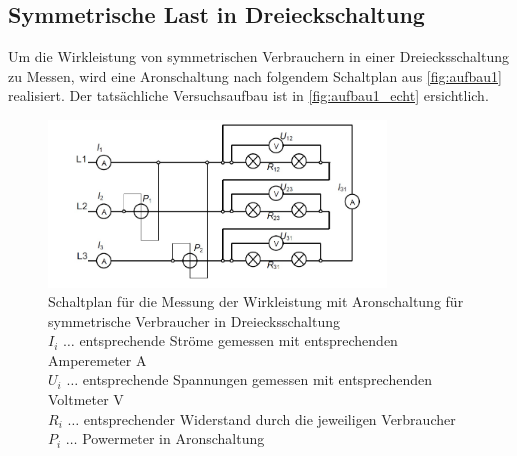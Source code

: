 \documentclass[12pt,english,ngerman]{scrartcl}
\begin{document}
\subsection{Symmetrische Last in Dreieckschaltung}

Um die Wirkleistung von symmetrischen Verbrauchern in einer Dreiecksschaltung zu Messen, wird eine Aronschaltung
 nach folgendem Schaltplan aus \autoref{fig:aufbau1} realisiert. 
 Der tatsächliche Versuchsaufbau ist in \autoref{fig:aufbau1_echt} ersichtlich.

 \begin{figure}[H]
	\begin{center}
		\includegraphics[width = 0.8\textwidth]{./figures/aufbau1.png}
	\end{center}
	\caption[Schaltplan für die Messung der Wirkleistung mit Aronschaltung für symmetrische
	Verbraucher in Dreiecksschaltung]
	{Schaltplan für die Messung der Wirkleistung mit Aronschaltung für symmetrische
	Verbraucher in Dreiecksschaltung~\cite[]{leistungsmessungvorbereitung}  \\
	$I_i$ \(\dots\) entsprechende Ströme gemessen mit entsprechenden Amperemeter A  \\
	$U_i$ \(\dots\) entsprechende Spannungen gemessen mit entsprechenden Voltmeter V  \\
	$R_i$ \(\dots\) entsprechender Widerstand durch die jeweiligen Verbraucher  \\
	$P_i$ \(\dots\) Powermeter in Aronschaltung
	}\label{fig:aufbau1}
\end{figure}
\end{document}
